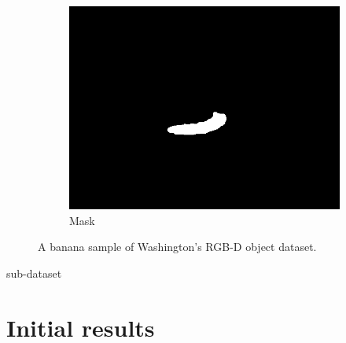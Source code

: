 \documentclass[paper=letter, fontsize=12pt]{article}
\begin{document}
\begin{figure}[htbp]
\begin{subfigure}[b]{0.32\linewidth}
		\includegraphics[width=\textwidth]{banana_1_1_1_mask}
		\caption{Mask}
	\end{subfigure}
	
	\caption{A banana sample of Washington's RGB-D object dataset.}
	\label{fig:banana}
\end{figure}

sub-dataset

\section{Initial results}
\end{document}
